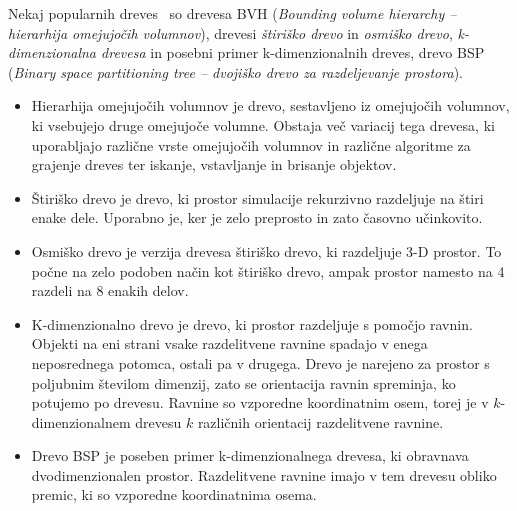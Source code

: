 \documentclass[a4paper,12pt]{article}
\begin{document}
Nekaj popularnih dreves~\cite{weller_brief_2013} so drevesa BVH (\textit{Bounding volume hierarchy -- hierarhija omejujočih volumnov}),
drevesi \textit{štiriško drevo} in \textit{osmiško drevo}, \textit{k-di\-men\-zi\-o\-nal\-na drevesa} in posebni primer k-di\-men\-zi\-o\-nal\-ni\-h
dreves, drevo BSP (\textit{Binary space partitioning tree -- dvojiško drevo za razdeljevanje prostora}).

\begin{itemize}
    \item Hierarhija omejujočih volumnov je drevo, sestavljeno iz omejujočih volumnov, ki vsebujejo
    druge omejujoče volumne. Obstaja več variacij tega drevesa, ki uporabljajo različne vrste omejujočih volumnov
    in različne algoritme za grajenje dreves ter iskanje, vstavljanje in brisanje objektov.
    \item Štiriško drevo je drevo, ki prostor simulacije rekurzivno razdeljuje na štiri enake dele. Uporabno je,
    ker je zelo preprosto in zato časovno učinkovito.~\cite{re_analysis_1985}
    \item Osmiško drevo je verzija drevesa štiriško drevo, ki razdeljuje 3-D prostor. To počne na zelo podoben način kot štiriško drevo, ampak
    prostor namesto na 4 razdeli na 8 enakih delov.~\cite{schnabel_octree-based_2006}
    \item K-dimenzionalno drevo je drevo, ki prostor razdeljuje s pomočjo ravnin. Objekti na eni strani vsake razdelitvene
    ravnine spadajo v enega neposrednega potomca, ostali pa v drugega. Drevo je narejeno za prostor s poljubnim številom dimenzij,
    zato se orientacija ravnin spreminja, ko potujemo po drevesu. Ravnine so vzporedne koordinatnim osem, torej je v
    $k$-dimenzionalnem drevesu $k$ različnih orientacij razdelitvene ravnine.~\cite{ramasubramanian_generalized_1989}
    \item Drevo BSP je poseben primer k-dimenzionalnega drevesa, ki obravnava dvodimenzionalen prostor. Razdelitvene
    ravnine imajo v tem drevesu obliko premic, ki so vzporedne koordinatnima osema.~\cite{chin_iii5_1995}
\end{itemize}
\end{document}
